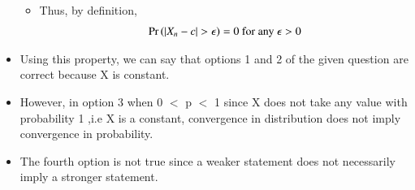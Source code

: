 \documentclass[journal,12pt,twocolumn]{IEEEtran}
\begin{document}
\begin{itemize}
\begin{itemize}
        \item Thus, by definition,
        \begin{align}
            \pr{|X_n-c|> \epsilon} = 0 \text{ for any }\epsilon > 0
        \end{align}
    \end{itemize}
    \item Using this property, we can say that options 1 and 2 of the given question are correct because X is constant.
    \item However, in option 3 when 0 $<$ p $<$ 1 since X does not take any value with probability 1 ,i.e X is a constant, convergence in distribution does not imply convergence in probability.
    \item The fourth option is not true since a weaker statement does not necessarily imply a stronger statement. 
\end{itemize}
\end{document}
